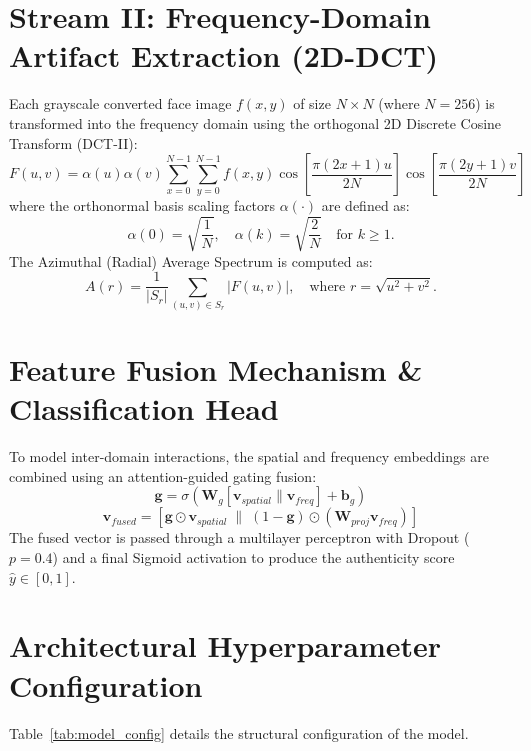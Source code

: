 \documentclass[12pt,a4paper]{report}
\begin{document}
\section{Stream II: Frequency-Domain Artifact Extraction (2D-DCT)}
Each grayscale converted face image $f(x, y)$ of size $N \times N$ (where $N=256$) is transformed into the frequency domain using the orthogonal 2D Discrete Cosine Transform (DCT-II):
\begin{equation}
F(u, v) = \alpha(u) \alpha(v) \sum_{x=0}^{N-1} \sum_{y=0}^{N-1} f(x, y) \cos\left[ \frac{\pi (2x + 1)u}{2N} \right] \cos\left[ \frac{\pi (2y + 1)v}{2N} \right]
\end{equation}
where the orthonormal basis scaling factors $\alpha(\cdot)$ are defined as:
\begin{equation}
\alpha(0) = \sqrt{\frac{1}{N}}, \quad \alpha(k) = \sqrt{\frac{2}{N}} \quad \text{for } k \ge 1.
\end{equation}
The Azimuthal (Radial) Average Spectrum is computed as:
\begin{equation}
A(r) = \frac{1}{|S_r|} \sum_{(u,v) \in S_r} |F(u, v)|, \quad \text{where } r = \sqrt{u^2 + v^2}.
\end{equation}

\section{Feature Fusion Mechanism \& Classification Head}
To model inter-domain interactions, the spatial and frequency embeddings are combined using an attention-guided gating fusion:
\begin{equation}
\mathbf{g} = \sigma\left( \mathbf{W}_g [\mathbf{v}_{spatial} \parallel \mathbf{v}_{freq}] + \mathbf{b}_g \right)
\end{equation}
\begin{equation}
\mathbf{v}_{fused} = \left[ \mathbf{g} \odot \mathbf{v}_{spatial} \;\parallel\; (1 - \mathbf{g}) \odot (\mathbf{W}_{proj} \mathbf{v}_{freq}) \right]
\end{equation}
The fused vector is passed through a multilayer perceptron with Dropout ($p=0.4$) and a final Sigmoid activation to produce the authenticity score $\hat{y} \in [0, 1]$.

\section{Architectural Hyperparameter Configuration}
Table~\ref{tab:model_config} details the structural configuration of the model.
\end{document}
